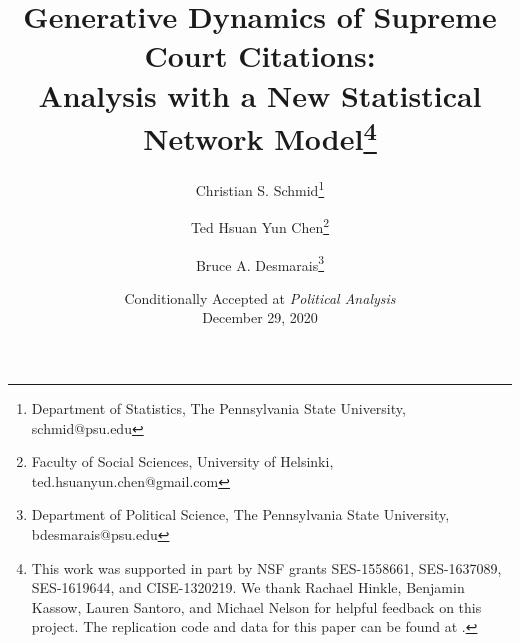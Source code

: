 \documentclass[headsepline=true, abstracton]{scrartcl}
\begin{document}
\renewcommand{\refname}{Bibliography}


\onehalfspacing
\setlength{\headsep}{15mm}


\thispagestyle{plain}

\title{\Large Generative Dynamics of Supreme Court Citations: \\ Analysis with a New Statistical Network Model\thanks{
		This work was supported in part by NSF grants SES-1558661, SES-1637089, SES-1619644, and CISE-1320219. We thank Rachael Hinkle, Benjamin Kassow, Lauren Santoro, and Michael Nelson for helpful feedback on this project. The replication code and data for this paper can be found at \citet{replicationdata}.}}

\author{%
  Christian S. Schmid\footnote{Department of Statistics, The Pennsylvania State University, schmid@psu.edu}%
  \and Ted Hsuan Yun Chen\footnote{Faculty of Social Sciences, University of Helsinki, ted.hsuanyun.chen@gmail.com}%
   \and Bruce A. Desmarais\footnote{Department of Political Science, The Pennsylvania State University, bdesmarais@psu.edu}%
  }

\date{Conditionally Accepted at \textit{Political Analysis}\\ December 29, 2020}
\end{document}
